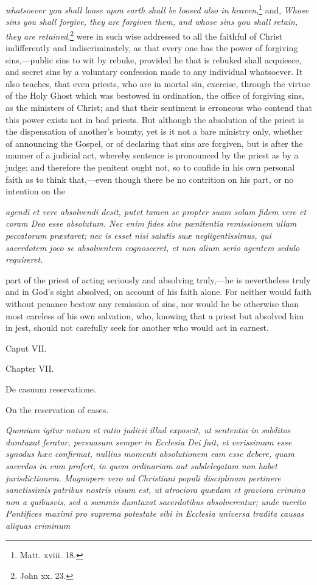 \emph{whatsoever you shall loose upon earth shall be loosed also in heaven},\footnote{\par   Matt. xviii. 18.} and, \emph{Whose sins you shall forgive, they are forgiven them, and whose sins you shall retain, they are retained},\footnote{\par   John xx. 23.} were in such wise addressed to all the faithful of Christ indifferently and indiscriminately, as that every one has the power of forgiving sins,—public sins to wit by rebuke, provided he that is rebuked shall acquiesce, and secret sins by a voluntary confession made to any individual whatsoever. It also teaches, that even priests, who are in mortal sin, exercise, through the virtue of the Holy Ghost which was bestowed in ordination, the office of forgiving sins, as the ministers of Christ; and that their sentiment is erroneous who contend that this power exists not in bad priests. But although the absolution of the priest is the dispensation of another's bounty, yet is it not a bare ministry only, whether of announcing the Gospel, or of declaring that sins are forgiven, but is after the manner of a judicial act, whereby sentence is pronounced by the priest as by a judge; and therefore the penitent ought not, so to confide in his own personal faith as to think that,—even though there be no contrition on his part, or no intention on the

\emph{agendi et vere absolvendi desit, putet tamen se propter suam solam fidem vere et coram Deo esse absolutum. Nec enim fides sine pœnitentia remissionem ullam peccatorum præstaret; nec is esset nisi salutis suæ negligentissimus, qui sacerdotem joco se absolventem cognosceret, et non alium serio agentem sedulo requireret.}

part of the priest of acting seriously and absolving truly,—he is nevertheless truly and in God's sight absolved, on account of his faith alone. For neither would faith without penance bestow any remission of sins, nor would he be otherwise than most careless of his own salvation, who, knowing that a priest but absolved him in jest, should not carefully seek for another who would act in earnest.

Caput VII.

Chapter VII.

De casuum reservatione.

On the reservation of cases.

\emph{Quoniam igitur natura et ratio judicii illud exposcit, ut sententia in subditos dumtaxat feratur, persuasum semper in Ecclesia Dei fuit, et verissimum esse synodus hæc confirmat, nullius momenti absolutionem eam esse debere, quam sacerdos in eum profert, in quem ordinariam aut subdelegatam non habet jurisdictionem. Magnopere vero ad Christiani populi disciplinam pertinere sanctissimis patribus nostris visum est, ut atrociora quædam et graviora crimina non a quibusvis, sed a summis dumtaxat sacerdotibus absolverentur; unde merito Pontifices maximi pro suprema potestate sibi in Ecclesia universa tradita causas aliquas criminum }

